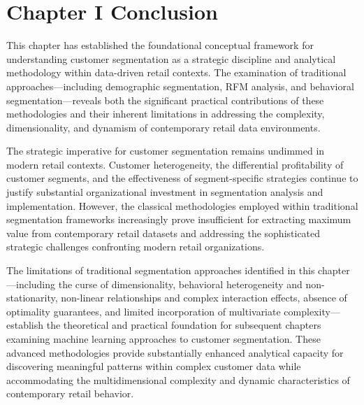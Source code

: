 \documentclass[12pt,a4paper,oneside]{report}
\begin{document}

\section*{Chapter I Conclusion}

This chapter has established the foundational conceptual framework for understanding customer segmentation as a strategic discipline and analytical methodology within data-driven retail contexts. The examination of traditional approaches—including demographic segmentation, RFM analysis, and behavioral segmentation—reveals both the significant practical contributions of these methodologies and their inherent limitations in addressing the complexity, dimensionality, and dynamism of contemporary retail data environments.

The strategic imperative for customer segmentation remains undimmed in modern retail contexts. Customer heterogeneity, the differential profitability of customer segments, and the effectiveness of segment-specific strategies continue to justify substantial organizational investment in segmentation analysis and implementation. However, the classical methodologies employed within traditional segmentation frameworks increasingly prove insufficient for extracting maximum value from contemporary retail datasets and addressing the sophisticated strategic challenges confronting modern retail organizations.

The limitations of traditional segmentation approaches identified in this chapter—including the curse of dimensionality, behavioral heterogeneity and non-stationarity, non-linear relationships and complex interaction effects, absence of optimality guarantees, and limited incorporation of multivariate complexity—establish the theoretical and practical foundation for subsequent chapters examining machine learning approaches to customer segmentation. These advanced methodologies provide substantially enhanced analytical capacity for discovering meaningful patterns within complex customer data while accommodating the multidimensional complexity and dynamic characteristics of contemporary retail behavior.

\end{document}
